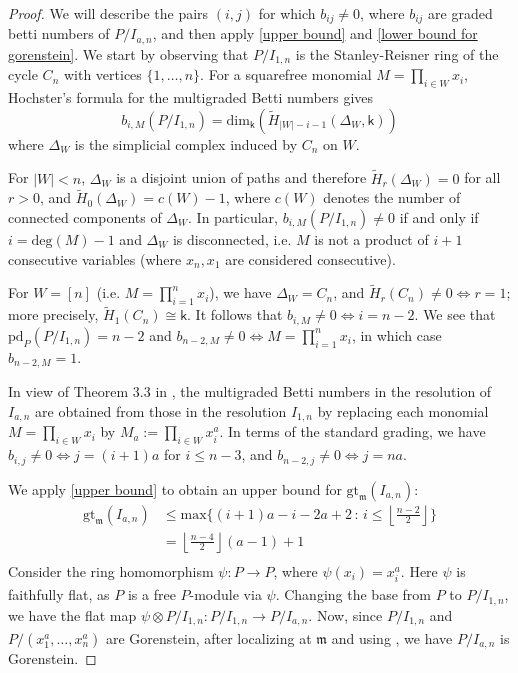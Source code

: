 \documentclass[10pt,reqno]{amsart}
\theoremstyle{definition}
\theoremstyle{remark}
\numberwithin{equation}{section}
\newcommand{\kk}{\mathsf k}
\newcommand{\m}{\mathfrak m}
\numberwithin{equation}{section}
\begin{document}
\begin{proof} We will describe the pairs $(i, j)$ for which $b_{ij}\ne 0$, where $b_{ij}$ are graded betti numbers of $P/I_{a, n}$, and then apply \cref{upper bound} and \cref{lower bound for gorenstein}.
We start by observing that $P/I_{1, n}$ is the Stanley-Reisner ring of the cycle $C_n$ with vertices $\{1, \ldots, n\}$.
For a squarefree monomial $\displaystyle M=\prod_{i\in W} x_i$, Hochster's formula \cite[Theorem 5.1]{hochster1977cohen} for the multigraded Betti numbers gives
$$
b_{i, M}(P/I_{1, n})=\mathrm{dim}_{\kk} (\tilde{H}_{|W|-i-1}(\Delta_W, \kk))
$$
where $\Delta_W$ is the simplicial complex induced by $C_n$ on $W$.

For $|W|<n$, $\Delta_W$ is a disjoint union of paths and therefore 
$\tilde{H}_r(\Delta_W)=0$ for all $r>0$, and $\tilde{H}_0(\Delta_W)=c(W)-1$, where $c(W)$ denotes the number of connected components of $\Delta_W$. In particular, 
$
b_{i, M}(P/I_{1, n})\ne 0$ if and only if $i=\mathrm{deg}(M)-1$ and $\Delta_W$ is disconnected, i.e. $M$ is not a product of $i+1$ consecutive variables (where $x_n, x_1$ are considered consecutive).

For $W=[n]$ (i.e. $M=\prod_{i=1}^n x_i$), we have $\Delta_W=C_n$, and $\tilde{H}_r(C_n)\ne 0\Leftrightarrow r=1$; more precisely, $\tilde{H}_1(C_n)\cong \kk$. It follows that 
$b_{i, M}\ne 0\Leftrightarrow i=n-2$. 
We see that $\mathrm{pd}_P(P/I_{1, n})=n-2$ and
$b_{n-2, M}\ne 0\Leftrightarrow M=\prod_{i=1}^n x_i$, in which case $b_{n-2, M}=1$.

In view of Theorem 3.3 in \cite{gasharov1999lcm}, the multigraded Betti numbers in the resolution of $I_{a, n}$ are obtained from those in the resolution $I_{1, n}$ by replacing each monomial $M=\prod_{i\in W} x_i$ by $M_a:=\prod_{i\in W} x_i^a$. In terms of the standard grading, we have $b_{i, j}\ne 0 \Leftrightarrow j=(i+1)a$ for $i\le n-3$, and $b_{n-2, j}\ne 0\Leftrightarrow j=na$.

We apply \cref{upper bound} to obtain an upper bound for $\mathrm{gt}_{\m}(I_{a, n})$:
\begin{equation}\label{gorenstein example}
    \begin{split}
\mathrm{gt}_{\m}(I_{a, n})& \le \mathrm{max}\{ (i+1)a-i-2a+2  \, : \,   i\le \left\lfloor \frac{n-2}{2}\right\rfloor \}\\
&=\left\lfloor \frac{n-4}{2}\right\rfloor (a-1)+1\\
\end{split}
\end{equation}
Consider the ring homomorphism $\psi:P\xrightarrow[]{}P$, where $\psi(x_i)=x_i^a$. Here $\psi$ is faithfully flat, as $P$ is a free $P$-module via $\psi$. Changing the base from $P$ to $P/I_{1,n}$, we have the flat map $ \psi\otimes P/I_{1,n} :P/I_{1,n}\xrightarrow[]{}P/I_{a,n}.$ Now, since $P/I_{1,n}$ and $P/(x_1^a,\ldots,x_n^{a})$ are Gorenstein, after localizing at $\m$ and using \cite[Corollary 3.3.15]{bruns1998cohen}, we have $P/I_{a,n}$ is Gorenstein.


\end{proof}
\end{document}
